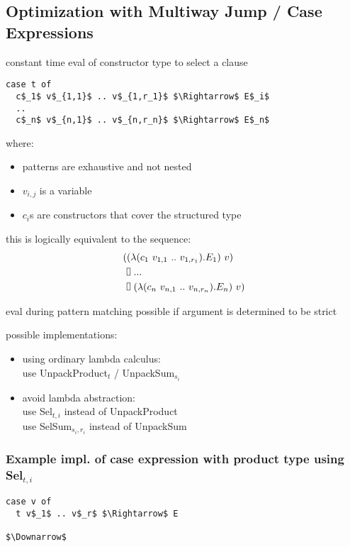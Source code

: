 \documentclass[8pt]{extarticle}
\newcommand*{\vrectangle}{{\setlength{\fboxsep}{0pt}\fbox{\phantom{l}}}}
\begin{document}
\begin{multicols*}{2}
\subsection{Optimization with Multiway Jump / Case Expressions}

constant time eval of constructor type to select a clause

\begin{lstlisting}
case t of
  c$_1$ v$_{1,1}$ .. v$_{1,r_1}$ $\Rightarrow$ E$_i$
  ..
  c$_n$ v$_{n,1}$ .. v$_{n,r_n}$ $\Rightarrow$ E$_n$
\end{lstlisting}
where:
  \begin{itemize}
  \item patterns are exhaustive and not nested
  \item $v_{i,j}$ is a variable
  \item $c_i$s are constructors that cover the structured type
  \end{itemize}
  
  this is logically equivalent to the sequence:
  \begin{align*}
    (&(\lambda(c_1\ v_{1,1}\ ..\ v_{1,r_1}). E_1)\ v)\\
     & \vrectangle\ ... \\
     & \vrectangle\ (\lambda(c_n\ v_{n,1}\ ..\ v_{n,r_n}).E_n)\ v)
  \end{align*}

  eval during pattern matching possible if argument is determined to be strict

possible implementations:
\begin{itemize}
\item using ordinary lambda calculus:\\
  use UnpackProduct$_t$ / UnpackSum$_{s_i}$
\item avoid lambda abstraction:\\
  use Sel$_{t, i}$ instead of UnpackProduct\\
  use SelSum$_{s_i, r_i}$ instead of UnpackSum
\end{itemize}

\subsubsection{Example impl. of case expression with product type using Sel$_{t,i}$}

\begin{lstlisting}
case v of
  t v$_1$ .. v$_r$ $\Rightarrow$ E

$\Downarrow$


\end{lstlisting}
\end{multicols*}
\end{document}
